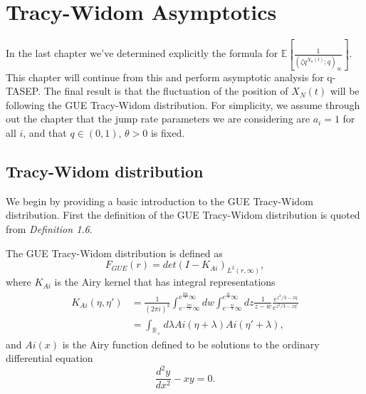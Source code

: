\chapter{Tracy-Widom Asymptotics}
In the last chapter we've determined explicitly the formula for $\mathbb{E}\left[ \frac{1}{(\zeta q^{X_n(t)}; q)_{\infty}} \right]$. This chapter will continue from this and perform asymptotic analysis for q-TASEP. The final result is that the fluctuation of the position of $X_N(t)$ will be following the GUE Tracy-Widom distribution. For simplicity, we assume through out the chapter that the jump rate parameters we are considering are $a_i = 1$ for all $i$, and that $q \in (0,1)$, $\theta > 0$ is fixed. 

\section{Tracy-Widom distribution}
We begin by providing a basic introduction to the GUE Tracy-Widom distribution. First the definition of the GUE Tracy-Widom distribution is quoted from \cite{tracy-widom-def} \textit{Definition 1.6}.

\begin{definition}
The GUE Tracy-Widom distribution is defined as $$F_{GUE}(r) = det(I-K_{Ai})_{L^2(r, \infty)},$$ where $K_{Ai}$ is the Airy kernel that has integral representations 
\begin{align*}
K_{Ai}(\eta, \eta') &= \frac{1}{(2 \pi i)^2} \int_{e^{-\frac{2 \pi i}{3}} \infty}^{e^{\frac{2 \pi i}{3}} \infty} dw \int_{e^{-\frac{\pi i}{3}} \infty}^{e^{\frac{\pi i}{3}} \infty} dz \frac{1}{z-w} \frac{e^{z^3 / 3 - z \eta}}{e^{z^3 / 3 - z \eta'}}\\
&= \int_{\mathbb{R}_+} d \lambda Ai(\eta + \lambda) Ai(\eta' + \lambda),
\end{align*}
and $Ai(x)$ is the Airy function defined to be solutions to the ordinary differential equation $$\frac{d^2 y}{dx^2} - xy = 0.$$
\end{definition}

